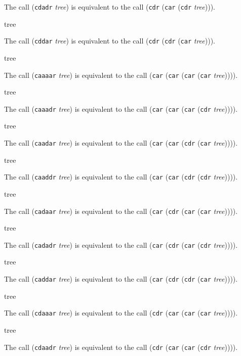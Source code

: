 The call (\texttt{cdadr} \textit{tree}) is equivalent to the call
(\texttt{cdr} (\texttt{car} (\texttt{cdr} \textit{tree}))).


 {tree}

The call (\texttt{cddar} \textit{tree}) is equivalent to the call
(\texttt{cdr} (\texttt{cdr} (\texttt{car} \textit{tree}))).

 {tree}

The call (\texttt{caaaar} \textit{tree}) is equivalent to the call
(\texttt{car} (\texttt{car} (\texttt{car} (\texttt{car}
\textit{tree})))).

 {tree}

The call (\texttt{caaadr} \textit{tree}) is equivalent to the call
(\texttt{car} (\texttt{car} (\texttt{car} (\texttt{cdr}
\textit{tree})))).

 {tree}

The call (\texttt{caadar} \textit{tree}) is equivalent to the call
(\texttt{car} (\texttt{car} (\texttt{cdr} (\texttt{car}
\textit{tree})))).

 {tree}

The call (\texttt{caaddr} \textit{tree}) is equivalent to the call
(\texttt{car} (\texttt{car} (\texttt{cdr} (\texttt{cdr}
\textit{tree})))).

 {tree}

The call (\texttt{cadaar} \textit{tree}) is equivalent to the call
(\texttt{car} (\texttt{cdr} (\texttt{car} (\texttt{car}
\textit{tree})))).

 {tree}

The call (\texttt{cadadr} \textit{tree}) is equivalent to the call
(\texttt{car} (\texttt{cdr} (\texttt{car} (\texttt{cdr}
\textit{tree})))).

 {tree}

The call (\texttt{caddar} \textit{tree}) is equivalent to the call
(\texttt{car} (\texttt{cdr} (\texttt{cdr} (\texttt{car}
\textit{tree})))).

 {tree}

The call (\texttt{cdaaar} \textit{tree}) is equivalent to the call
(\texttt{cdr} (\texttt{car} (\texttt{car} (\texttt{car}
\textit{tree})))).

 {tree}

The call (\texttt{cdaadr} \textit{tree}) is equivalent to the call
(\texttt{cdr} (\texttt{car} (\texttt{car} (\texttt{cdr}
\textit{tree})))).


